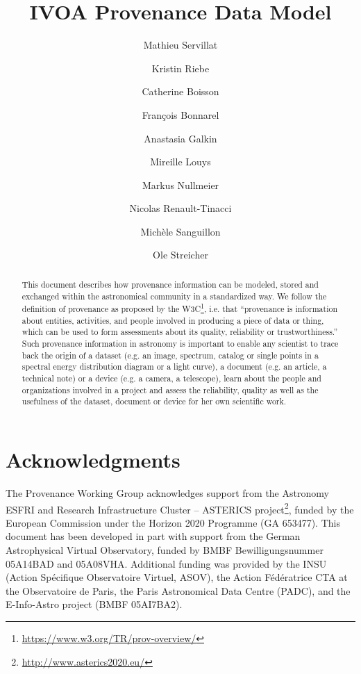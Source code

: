 \documentclass[11pt,a4paper]{ivoa}
\author{Mathieu Servillat}
\author{Kristin Riebe}
\author{Catherine Boisson}
\author{François Bonnarel}
\author{Anastasia Galkin}
\author{Mireille Louys}
\author{Markus Nullmeier}
\author{Nicolas Renault-Tinacci}
\author{Michèle Sanguillon}
\author{Ole Streicher}
\begin{document}

\lstset{escapechar=@,style=customc}

\title{IVOA Provenance Data Model}


\begin{abstract}
This document describes how provenance information can be modeled, stored and exchanged within the astronomical community in a standardized way.
We follow the definition of provenance as proposed by the W3C\footnote{\url{https://www.w3.org/TR/prov-overview/}}, i.e. that ``provenance is information about entities, activities, and people involved in producing a piece of data or thing, which can be used to form assessments about its quality, reliability or trustworthiness.''
Such provenance information in astronomy is important to enable any scientist to trace back the origin of a dataset (e.g. an image, spectrum, catalog or single points in a spectral energy distribution diagram or a light curve), a document (e.g. an article, a technical note) or a device (e.g. a camera, a telescope), learn about the people and organizations involved in a project and assess the reliability, quality as well as the usefulness of the dataset, document or device for her own scientific work.
\end{abstract}

\section*{Acknowledgments}

The Provenance Working Group acknowledges support from the Astronomy ESFRI and Research Infrastructure Cluster – ASTERICS project\footnote{\url{http://www.asterics2020.eu/}}, funded by the European Commission under the Horizon 2020 Programme (GA 653477).
This document has been developed in part with support from the German Astrophysical Virtual Observatory, funded by BMBF Bewilligungsnummer 05A14BAD and 05A08VHA.
Additional funding was provided by the INSU (Action Spécifique Observatoire Virtuel, ASOV), the Action Fédératrice CTA at the Observatoire de Paris, the Paris Astronomical Data Centre (PADC), and the E-Info-Astro project (BMBF 05AI7BA2).
\end{document}

